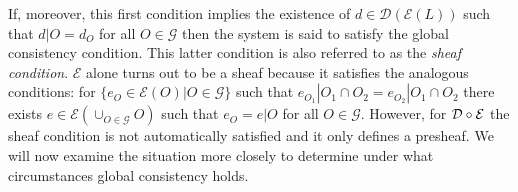 If, moreover, this first condition implies the existence of $d \in \mathcal{D}( \mathcal{E}(L))$ such that $d|O = d_O$ for all $O \in \mathcal{G}$ then the system is said to satisfy the global consistency condition.  This latter condition is also referred to as the \emph{sheaf condition}.  $\mathcal{E}$ alone turns out to be a sheaf because it satisfies the analogous conditions: for $\{e_O \in \mathcal{E}(O) | O \in \mathcal{G}\}$ such that $e_{O_{1}} | O_1 \cap O_2 = e_{O_{2}} | O_1 \cap O_2$ there exists $e \in \mathcal{E}(\cup_{O \in \mathcal{G}} O)$ such that $e_O = e|O$ for all $O \in \mathcal{G}$.  However, for $\mathcal{D} \circ \mathcal{E}$ the sheaf condition is not automatically satisfied and it only defines a presheaf.  We will now examine the situation more closely to determine under what circumstances global consistency holds.

